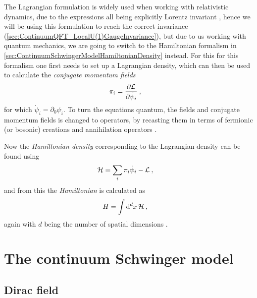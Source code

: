 \documentclass[../main.tex]{subfiles} %
\begin{document}
The Lagrangian formulation is widely used when working with relativistic dynamics, due to the expressions all being explicitly Lorentz invariant \cite{peskin_introToQFT_1995}, hence we will be using this formulation to reach the correct invariance (\cref{sec:ContinuumQFT_LocalU(1)GaugeInvariance}), but due to us working with quantum mechanics, we are going to switch to the Hamiltonian formalism in \cref{sec:ContinuumSchwingerModelHamiltonianDensity} instead. For this for this formalism one first needs to set up a Lagrangian density, which can then be used to calculate the \emph{conjugate momentum fields} \cite{peskin_introToQFT_1995,Clark_LagrangianQFT_1988}
\begin{align} \label{eq:LagrangianFormalism_ConjugateMomentumField}
    \pi_i &= \pdv{\mathcal{L}}{\dot{\psi}_i} \: ,
\end{align}
for which $\dot{\psi}_i = \partial_0\psi_i$. To turn the equations quantum, the fields and conjugate momentum fields is changed to operators, by recasting them in terms of fermionic (or bosonic) creations and annihilation operators \cite{panyella_masterThesis_2019}.

Now the \emph{Hamiltonian density} corresponding to the Lagrangian density can be found using
\begin{align} \label{eq:LagrangianFormalism_HamiltonianDensity}
    \mathcal{H} &= \sum_i \pi_i \dot{\psi}_i - \mathcal{L} \: ,
\end{align}
and from this the \emph{Hamiltonian} is calculated as
\begin{align} \label{eq:LagrangianFormalism_Hamiltonian}
    H &= \int \dd[d]{x} \mathcal{H} \: ,
\end{align}
again with $d$ being the number of spatial dimensions \cite{Clark_LagrangianQFT_1988}.




\section{The continuum Schwinger model} \label{Sec:ContinuumSchwingerModel}




\subsection{Dirac field}
\end{document}
